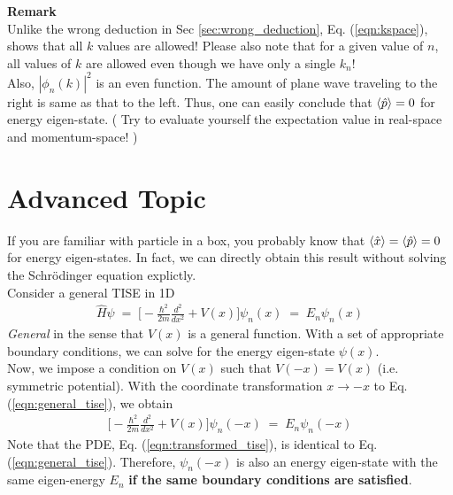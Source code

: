 \documentclass[12pt,a4paper]{article}
\begin{document}
\textbf{Remark}\\
Unlike the wrong deduction in Sec \ref{sec:wrong_deduction}, Eq. (\ref{eqn:kspace}), shows that all $k$ values are allowed! Please also note that for a given value of $n$, all values of $k$ are allowed even though we have only a single $k_{n}$!\\

Also, $|\phi_{n}(k)|^{2}$ is an even function. The amount of plane wave traveling to the right is same as that to the left. Thus, one can easily conclude that $\Braket{\hat{p}} = 0$ for energy eigen-state. (\color{blue} Try to evaluate yourself the expectation value in real-space and momentum-space!  \color{black})


\clearpage


\section{Advanced Topic}

If you are familiar with particle in a box, you probably know that $\braket{\hat{x}} = \braket{\hat{p}} = 0$ for energy eigen-states. In fact, we can directly obtain this result without solving the Schr\"{o}dinger equation explictly.\\

Consider a general TISE in 1D
\begin{align}
	\hat{H} \psi \; = \;  \Bigg[ -\frac{\hbar^{2}}{2m} \frac{d^{2}}{dx^{2}} + V(x) \Bigg] \psi_{n}(x) \; = \;  E_{n} \psi_{n}(x) \label{eqn:general_tise}
\end{align}
\textit{General} in the sense that $V(x)$ is a general function. With a set of appropriate boundary conditions, we can solve for the energy eigen-state $\psi(x)$.\\

Now, we impose a condition on $V(x)$ such that $V(-x) = V(x)$ (i.e. symmetric potential). With the coordinate transformation $x \to -x$ to Eq. (\ref{eqn:general_tise}), we obtain
\begin{align}
	\Bigg[ -\frac{\hbar^{2}}{2m} \frac{d^{2}}{dx^{2}} + V(x) \Bigg] \psi_{n}(-x) \; = \;  E_{n} \psi_{n}(-x) \label{eqn:transformed_tise}
\end{align}
Note that the PDE, Eq. (\ref{eqn:transformed_tise}), is identical to Eq. (\ref{eqn:general_tise}). Therefore, $\psi_{n}(-x)$ is also an energy eigen-state with the same eigen-energy $E_{n}$ \textbf{if the same boundary conditions are satisfied}.\\
\end{document}
